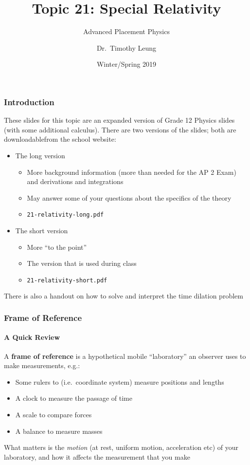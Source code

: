 \documentclass[12pt,compress,aspectratio=169]{beamer}
\title{Topic 21: Special Relativity}
\subtitle{Advanced Placement Physics}
\author[TML]{Dr.\ Timothy Leung}
\institute{Olympiads School}
\date{Winter/Spring 2019}
\begin{document}
\begin{frame}
  \maketitle
\end{frame}



\begin{frame}
  \frametitle{Introduction}
  These slides for this topic are an expanded version of Grade 12 Physics slides
  (with some additional calculus). There are two versions of the slides; both
  are downloadablefrom the school website:
  \begin{itemize}
  \item The long version
    \begin{itemize}
    \item More background information (more than needed for the AP 2 Exam) and
      derivations and integrations
    \item May answer some of your questions about the specifics of the theory
    \item \texttt{21-relativity-long.pdf}
    \end{itemize}
  \item<alert@1> The short version
    \begin{itemize}
    \item More ``to the point''
    \item The version that is used during class
    \item \texttt{21-relativity-short.pdf}
    \end{itemize}
  \end{itemize}
  There is also a handout on how to solve and interpret the time dilation
  problem
\end{frame}


\begin{frame}
  \frametitle{Frame of Reference}
  \framesubtitle{A Quick Review}
  A \textbf{frame of reference} is a hypothetical mobile ``laboratory'' an
  observer uses to make measurements, e.g.:
  \begin{itemize} 
  \item Some rulers to (i.e.\ coordinate system) measure positions and lengths
  \item A clock to measure the passage of time
  \item A scale to compare forces
  \item A balance to measure masses
  \end{itemize}
  What matters is the \emph{motion} (at rest, uniform motion, acceleration
    etc) of your laboratory, and how it affects the measurement that you make
%  
\end{frame}
\end{document}

